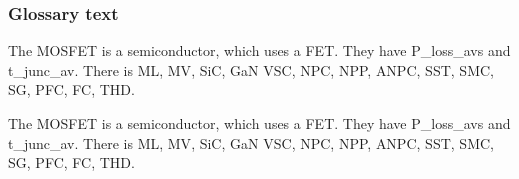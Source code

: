 \begin{frame}
	\frametitle{Glossary text}%
    The \gls{MOSFET} is a semiconductor, which uses a \gls{FET}. They have \glspl{P_loss_av} and \gls{t_junc_av}. There is \gls{ML}, \gls{MV}, \gls{SiC}, \gls{GaN} \gls{VSC}, \gls{NPC}, \gls{NPP}, \gls{ANPC}, \gls{SST}, \gls{SMC}, \gls{SG}, \gls{PFC}, \gls{FC}, \gls{THD}.

    The \gls{MOSFET} is a semiconductor, which uses a \gls{FET}. They have \glspl{P_loss_av} and \gls{t_junc_av}. There is \gls{ML}, \gls{MV}, \gls{SiC}, \gls{GaN} \gls{VSC}, \gls{NPC}, \gls{NPP}, \gls{ANPC}, \gls{SST}, \gls{SMC}, \gls{SG}, \gls{PFC}, \gls{FC}, \gls{THD}.
\end{frame}